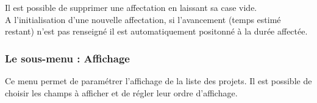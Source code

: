 Il est possible de supprimer une affectation en laissant sa case vide.\\

A l'initialisation d'une nouvelle affectation, si l'avancement (temps estimé restant) n'est pas renseigné il est automatiquement positonné à la durée affectée.


\subsubsection{Le sous-menu : Affichage}

Ce menu permet de paramétrer l'affichage de la liste des projets. Il est possible de choisir les champs à afficher et de régler leur ordre d'affichage.
